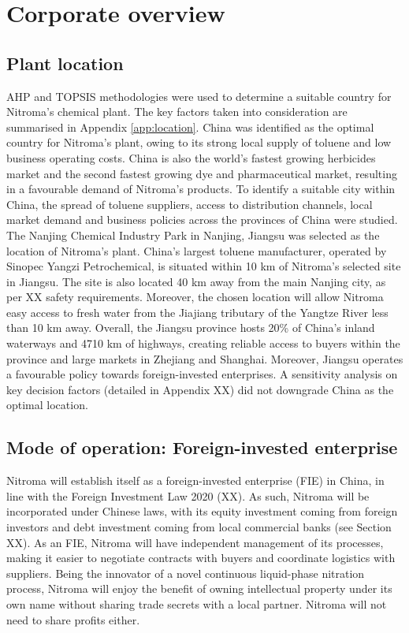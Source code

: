 \section{Corporate overview}
\subsection{Plant location}
\label{sec:location}
AHP and TOPSIS methodologies were used to determine a suitable country for Nitroma’s chemical plant. The key factors taken into consideration are summarised in Appendix \ref{app:location}. China was identified as the optimal country for Nitroma's plant, owing to its strong local supply of toluene and low business operating costs. China is also the world’s fastest growing herbicides market and the second fastest growing dye and pharmaceutical market, resulting in a favourable demand of Nitroma’s products. To identify a suitable city within China, the spread of toluene suppliers, access to distribution channels, local market demand and business policies across the provinces of China were studied. The Nanjing Chemical Industry Park in Nanjing, Jiangsu was selected as the location of Nitroma’s plant. China’s largest toluene manufacturer, operated by Sinopec Yangzi Petrochemical, is situated within 10 km of Nitroma’s selected site in Jiangsu. The site is also located 40 km away from the main Nanjing city, as per XX safety requirements. Moreover, the chosen location will allow Nitroma easy access to fresh water from the Jiajiang tributary of the Yangtze River less than 10 km away. Overall, the Jiangsu province hosts 20\% of China’s inland waterways and 4710 km of highways, creating reliable access to buyers within the province and large markets in Zhejiang and Shanghai. Moreover, Jiangsu operates a favourable policy towards foreign-invested enterprises. A sensitivity analysis on key decision factors (detailed in Appendix XX) did not downgrade China as the optimal location.

\subsection{Mode of operation: Foreign-invested enterprise}
\label{sec:mode-of-operation}
Nitroma will establish itself as a foreign-invested enterprise (FIE) in China, in line with the Foreign Investment Law 2020 (XX). As such, Nitroma will be incorporated under Chinese laws, with its equity investment coming from foreign investors and debt investment coming from local commercial banks (see Section XX). As an FIE, Nitroma will have independent management of its processes, making it easier to negotiate contracts with buyers and coordinate logistics with suppliers. Being the innovator of a novel continuous liquid-phase nitration process, Nitroma will enjoy the benefit of owning intellectual property under its own name without sharing trade secrets with a local partner. Nitroma will not need to share profits either. 

